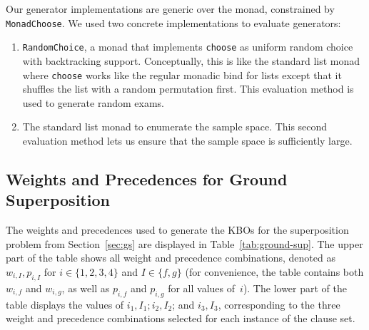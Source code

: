 Our generator implementations are generic over the monad, constrained by \texttt{MonadChoose}.
We used two concrete implementations to evaluate generators:
\begin{enumerate}
    \item
        \texttt{RandomChoice}, a monad that implements \texttt{choose}
        as uniform random choice with backtracking support.
        Conceptually, this is like the standard list monad
        where \texttt{choose} works like the regular monadic bind for lists
        except that it shuffles the list with a random permutation first.
        This evaluation method is used to generate random exams.
    \item
        The standard list monad to enumerate the sample space.
        This second evaluation method lets us ensure that the sample space is sufficiently large.
\end{enumerate}

\subsection{Weights and Precedences for Ground Superposition}

The weights and precedences used to generate the KBOs for the superposition problem
from Section~\ref{sec:gs}
are displayed in Table~\ref{tab:ground-sup}.
The upper part of the table shows all weight and precedence combinations,
denoted as $w_{i, I}, p_{i, I}$ for $i \in \{1, 2, 3, 4\}$
and $I \in \{f, g\}$ (for convenience, the table contains both $w_{i, f}$
and $w_{i, g}$, as well as $p_{i, f}$ and $p_{i, g}$ for all values of~$i$).
The lower part of the table displays the values of $i_1, I_1; i_2, I_2$; and $i_3, I_3$,
corresponding to the three weight and precedence combinations selected for
each instance of the clause set.

